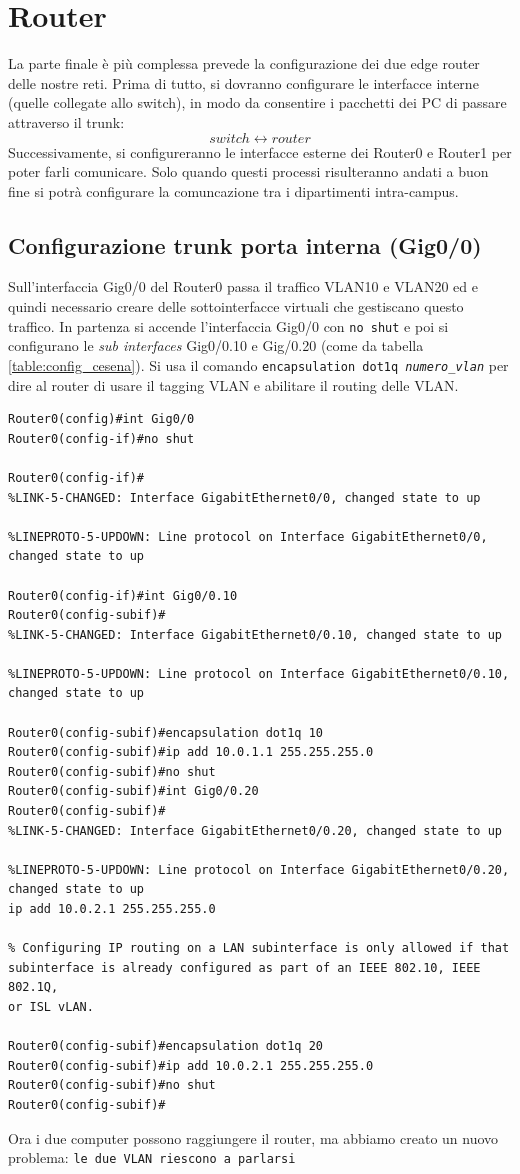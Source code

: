 \documentclass[a4paper,12pt]{report}
\begin{document}
\section{Router}
La parte finale è più complessa prevede la configurazione dei due edge router delle nostre reti.
%
Prima di tutto, si dovranno configurare le interfacce interne (quelle collegate allo switch), in modo da consentire i pacchetti dei PC di passare attraverso il trunk: $$switch \longleftrightarrow router$$
%
Successivamente, si configureranno le interfacce esterne dei Router0 e Router1 per poter farli comunicare.
%
Solo quando questi processi risulteranno andati a buon fine si potrà configurare la comuncazione tra i dipartimenti intra-campus.
\subsection{Configurazione trunk porta interna (Gig0/0)}
Sull'interfaccia Gig0/0 del Router0 passa il traffico VLAN10 e VLAN20 ed e quindi necessario creare delle sottointerfacce virtuali che gestiscano questo traffico.
%
In partenza si accende l'interfaccia Gig0/0 con \texttt{no shut} e poi si configurano le \textit{sub interfaces} Gig0/0.10 e Gig/0.20 (come da tabella \ref{table:config_cesena}).
%
Si usa il comando \texttt{encapsulation dot1q \textit{numero\_vlan}} per dire al router di usare il tagging VLAN e abilitare il routing delle VLAN.
\begin{verbatim}
Router0(config)#int Gig0/0
Router0(config-if)#no shut

Router0(config-if)#
%LINK-5-CHANGED: Interface GigabitEthernet0/0, changed state to up

%LINEPROTO-5-UPDOWN: Line protocol on Interface GigabitEthernet0/0, changed state to up

Router0(config-if)#int Gig0/0.10
Router0(config-subif)#
%LINK-5-CHANGED: Interface GigabitEthernet0/0.10, changed state to up

%LINEPROTO-5-UPDOWN: Line protocol on Interface GigabitEthernet0/0.10, changed state to up

Router0(config-subif)#encapsulation dot1q 10
Router0(config-subif)#ip add 10.0.1.1 255.255.255.0
Router0(config-subif)#no shut
Router0(config-subif)#int Gig0/0.20
Router0(config-subif)#
%LINK-5-CHANGED: Interface GigabitEthernet0/0.20, changed state to up

%LINEPROTO-5-UPDOWN: Line protocol on Interface GigabitEthernet0/0.20, changed state to up
ip add 10.0.2.1 255.255.255.0

% Configuring IP routing on a LAN subinterface is only allowed if that
subinterface is already configured as part of an IEEE 802.10, IEEE 802.1Q,
or ISL vLAN.

Router0(config-subif)#encapsulation dot1q 20
Router0(config-subif)#ip add 10.0.2.1 255.255.255.0
Router0(config-subif)#no shut
Router0(config-subif)#
\end{verbatim}
Ora i due computer possono raggiungere il router, ma abbiamo creato un nuovo problema: \texttt{le due VLAN riescono a parlarsi}
\end{document}
